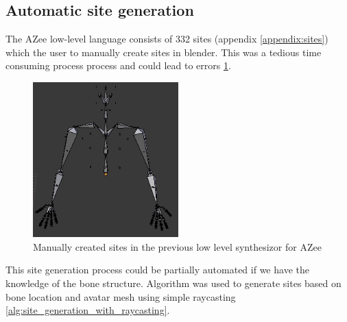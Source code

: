 \documentclass[../../main.tex]{subfiles}
\begin{document}
\subsection{Automatic site generation}
\label{subsec:auto_site_generation}

The AZee low-level language consists of 332 sites (appendix \ref{appendix:sites}) which the user to manually create sites in blender. This was a tedious time consuming process process and could lead to errors \ref{fig:prev_sites}.

\begin{figure}[h]
    \centering
    \includegraphics[width=0.5\textwidth]{chapters/rigging_layers/images/prev_sites.png}
    \caption{Manually created sites in the previous low level synthesizor for AZee}
    \label{fig:prev_sites}
\end{figure}

This site generation process could be partially automated if we have the knowledge of the bone structure. Algorithm was used to generate sites based on bone location and avatar mesh using simple raycasting \ref{alg:site_generation_with_raycasting}.
\end{document}

